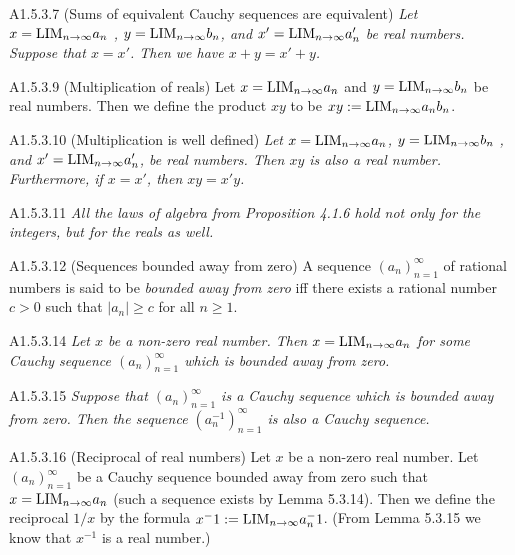 \begin{lemma}{A1.5.3.7}
    (Sums of equivalent Cauchy sequences are equivalent) \emph{Let $x = \text{LIM}_{n \rightarrow \infty}{a_n}$
    , $y = \text{LIM}_{n \rightarrow \infty}{b_n}$, and $x' = \text{LIM}_{n \rightarrow \infty}{a_n'}$ be real numbers.
    Suppose that $x = x'$. Then we have $x + y = x' + y$.}
\end{lemma}

\begin{definition}{A1.5.3.9}
    (Multiplication of reals) Let $x = \text{LIM}_{n \rightarrow \infty}{a_n}$ and $y = \text{LIM}_{n \rightarrow \infty}{b_n}$
    be real numbers. Then we define the product $xy$ to be $xy := \text{LIM}_{n \rightarrow \infty}{a_n b_n}$.
\end{definition}

\begin{lemma}{A1.5.3.10}
    (Multiplication is well defined) \emph{Let $x = \text{LIM}_{n \rightarrow \infty}{a_n}$, $y = \text{LIM}_{n \rightarrow \infty}{b_n}$
    , and $x' = \text{LIM}_{n \rightarrow \infty}{a_n'}$, be real numbers.
    Then $xy$ is also a real number. Furthermore, if $x = x'$, then $xy = x'y$.}
\end{lemma}

\begin{proposition}{A1.5.3.11}
    \emph{All the laws of algebra from Proposition 4.1.6 hold not only for the integers,
    but for the reals as well.}
\end{proposition}

\begin{definition}{A1.5.3.12}
    (Sequences bounded away from zero) A sequence $(a_n)_{n=1}^{\infty}$ of rational
    numbers is said to be \emph{bounded away from zero} iff there exists a rational
    number $c > 0$ such that $|a_n| \geq c$ for all $n \geq 1$.
\end{definition}

\begin{lemma}{A1.5.3.14}
    \emph{Let $x$ be a non-zero real number. Then $x = \text{LIM}_{n \rightarrow \infty}{a_n}$ for
    some Cauchy sequence $(a_n)_{n=1}^{\infty}$ which is bounded away from zero.}
\end{lemma}

\begin{lemma}{A1.5.3.15}
    \emph{Suppose that $(a_n)_{n=1}^{\infty}$ is a Cauchy sequence which is bounded
    away from zero. Then the sequence $(a_n^{-1})_{n=1}^{\infty}$ is also a Cauchy
    sequence.}
\end{lemma}

\begin{definition}{A1.5.3.16}
    (Reciprocal of real numbers) Let $x$ be a non-zero real number. Let $(a_n)_{n=1}^{\infty}$
    be a Cauchy sequence bounded away from zero such that $x = \text{LIM}_{n \rightarrow \infty}{a_n}$
    (such a sequence exists by Lemma 5.3.14). Then we define the reciprocal $1/x$
    by the formula $x^-1 := \text{LIM}_{n \rightarrow \infty}{a_n^-1}$. (From Lemma 5.3.15 we know that
    $x^{-1}$ is a real number.)
\end{definition}

